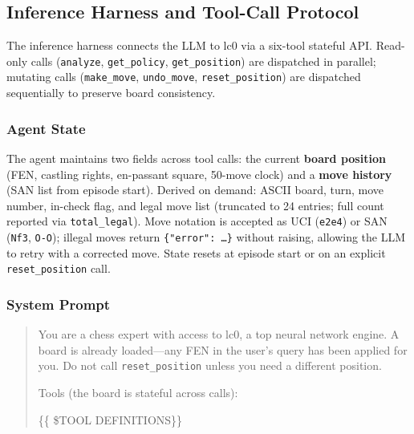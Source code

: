 \subsection{Inference Harness and Tool-Call Protocol}
\label{sec:app_toolcall}

The inference harness connects the LLM to lc0 via a six-tool stateful API.
Read-only calls (\texttt{analyze}, \texttt{get\_policy}, \texttt{get\_position}) are
dispatched in parallel; mutating calls (\texttt{make\_move}, \texttt{undo\_move},
\texttt{reset\_position}) are dispatched sequentially to preserve board consistency.

\subsubsection{Agent State}
\label{sec:app_toolcall_state}
\begin{tcolorbox}[statebox, title={Agent State}]
The agent maintains two fields across tool calls: the current \textbf{board position}
(FEN, castling rights, en-passant square, 50-move clock) and a \textbf{move history}
(SAN list from episode start).
Derived on demand: ASCII board, turn, move number, in-check flag, and legal move list
(truncated to 24 entries; full count reported via \texttt{total\_legal}).
Move notation is accepted as UCI (\texttt{e2e4}) or SAN (\texttt{Nf3}, \texttt{O-O});
illegal moves return \texttt{\{"error": \ldots\}} without raising, allowing the LLM to
retry with a corrected move.
State resets at episode start or on an explicit \texttt{reset\_position} call.
\end{tcolorbox}

\subsubsection{System Prompt}
\label{sec:app_toolcall_prompt}

\begin{tcolorbox}[promptbox, title={$\triangleright$\; System Prompt --- Chess Analyst}]
\begin{quote}
You are a chess expert with access to lc0, a top neural network engine.
A board is already loaded---any FEN in the user's query has been applied for you.
Do not call \texttt{reset\_position} unless you need a different position.

\smallskip
Tools (the board is stateful across calls):

\{\{ \$TOOL DEFINITIONS\}\}
\end{quote}
\end{tcolorbox}

